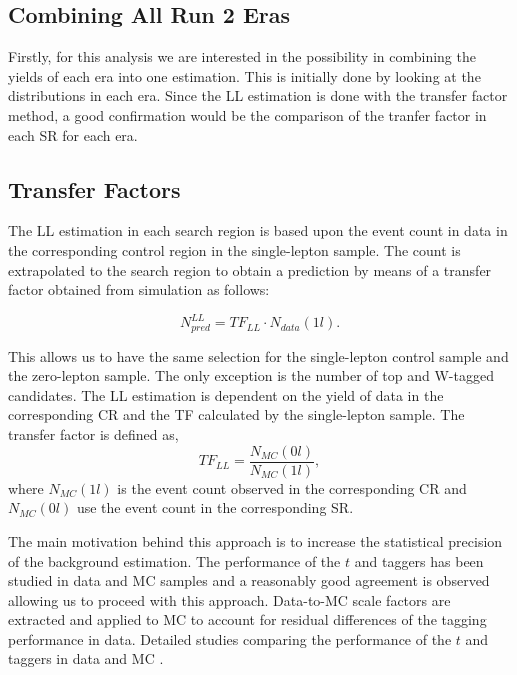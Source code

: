 \subsection{Combining All Run 2 Eras}\label{sec:LLCombination}
Firstly, for this analysis we are interested in the possibility in combining the yields of each era into one estimation. This is initially done by looking at the \met{} distributions in each era. Since the LL estimation is done with the transfer factor method, a good confirmation would be the comparison of the tranfer factor in each SR for each era. 


\subsection{Transfer Factors}
\label{subsec:TF}

The LL estimation in each search region is based upon the event count in data in the corresponding control region in the single-lepton sample. The count is extrapolated to the search region to obtain a prediction by means of a transfer factor obtained from simulation as follows: 

\begin{equation}
\label{eqn:LLTF}
N_{pred}^{LL}=TF_{LL} \cdot N_{data}(1l).
\end{equation}

This allows us to have the same selection for the single-lepton control sample and the zero-lepton sample. The only exception is the number of top and W-tagged candidates. The LL estimation is dependent on the yield of data in the corresponding CR and the TF calculated by the single-lepton sample. The transfer factor is defined as, 
\begin{equation}
\label{eqn:TF}
TF_{LL}=\frac{N_{MC}(0l)}{N_{MC}(1l)},
\end{equation}
where $N_{MC}(1l)$ is the event count observed in the corresponding CR and $N_{MC}(0l)$ use the event count in the corresponding SR. 

The main motivation behind this approach is to increase the statistical precision of the background estimation. The performance of the $t$ and \W{} taggers has been studied in data and MC samples and a reasonably good agreement is observed allowing us to proceed with this approach. Data-to-MC scale factors are extracted and applied to MC to account for residual differences of the tagging performance in data. Detailed studies comparing the performance of the $t$ and \W{} taggers in data and MC \cite{noauthor_search_nodate}.

